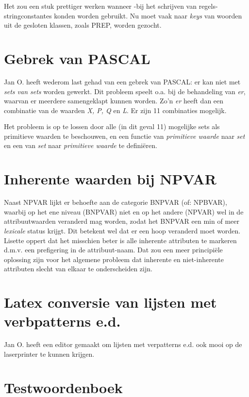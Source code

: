 Het zou een stuk prettiger werken wanneer -bij het schrijven van regels- 
stringconstantes konden worden gebruikt. Nu moet vaak naar {\em keys} van
woorden uit de gesloten klassen, zoals PREP, worden 
gezocht.

\section{Gebrek van PASCAL}

Jan O. heeft wederom last gehad van een gebrek van PASCAL: er kan niet met 
{\em sets van sets} worden gewerkt. Dit probleem speelt o.a. bij de
behandeling van {\em er}, waarvan er meerdere samengeklapt kunnen worden. Zo'n 
{\em er} heeft dan een combinatie van de waarden {\em X, P, Q} en {\em L}. Er 
zijn 11 combinaties mogelijk.

Het probleem is op te lossen door alle (in dit geval 11) mogelijke sets als
primitieve waarden te beschouwen, en een functie van {\em primitieve waarde} 
naar {\em set} en een van {\em set} naar  {\em primitieve waarde} te 
defini\"{e}ren.  

\section{Inherente waarden bij NPVAR}

Naast NPVAR lijkt er behoefte aan de categorie BNPVAR (of: NPBVAR), waarbij op 
het ene niveau (BNPVAR) niet en op het andere (NPVAR) wel in de 
attribuutwaarden veranderd mag worden, zodat het BNPVAR een min of meer 
{\em lexicale} status krijgt. Dit betekent wel dat er een hoop veranderd moet 
worden. Lisette oppert dat het misschien beter is alle inherente attributen te 
markeren d.m.v. een prefigering in de attribuut-naam. Dat zou een 
meer principi\"{e}le oplossing zijn voor het algemene probleem dat inherente en 
niet-inherente attributen slecht van elkaar te onderscheiden zijn.

\section{Latex conversie van lijsten met verbpatterns e.d.}

Jan O. heeft een editor gemaakt om lijsten met verpatterns e.d. ook mooi op de 
laserprinter te kunnen krijgen.

\section{Testwoordenboek}

